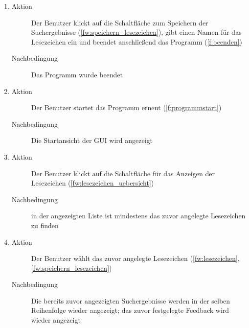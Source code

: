 \begin{enumerate} [label=\bfseries /TSW \arabic*0/, leftmargin=*]
\begin{enumerate}[leftmargin=0pt]
\begin{description}
			\item[Nachbedingung] Die bereits zuvor angezeigten Suchergebnisse werden in der selben Reihenfolge wieder angezeigt; das zuvor festgelegte \gls{Feedback} wird wieder angezeigt
		\end{description}
		\item
		\begin{description}
			\item[Aktion] Der Benutzer klickt auf die Schaltfläche zum Speichern der Suchergebnisse (\ref{fw:speichern_lesezeichen}), gibt einen Namen für das \gls{Lesezeichen} ein und beendet anschließend das Programm (\ref{f:beenden})
			\item[Nachbedingung] Das Programm wurde beendet
		\end{description}
		\item
		\begin{description}
			\item[Aktion] Der Benutzer startet das Programm erneut (\ref{f:programmstart})
			\item[Nachbedingung] Die Startansicht der \gls{GUI} wird angezeigt
		\end{description}
		\item
		\begin{description}
			\item[Aktion] Der Benutzer klickt auf die Schaltfläche für das Anzeigen der \gls{Lesezeichen} (\ref{fw:lesezeichen_uebersicht})
			\item[Nachbedingung] in der angezeigten Liste ist mindestens das zuvor angelegte \gls{Lesezeichen} zu finden
		\end{description}
		\item
		\begin{description}
			\item[Aktion] Der Benutzer wählt das zuvor angelegte \gls{Lesezeichen} (\ref{fw:lesezeichen}, \ref{fw:speichern_lesezeichen})
			\item[Nachbedingung] Die bereits zuvor angezeigten Suchergebnisse werden in der selben Reihenfolge wieder angezeigt; das zuvor festgelegte \gls{Feedback} wird wieder angezeigt
		\end{description}
	\end{enumerate}


\end{enumerate}
